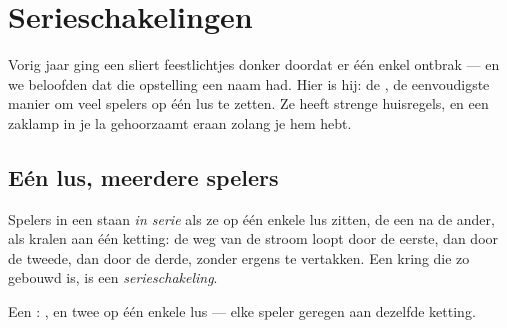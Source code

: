\chapter{Serieschakelingen}\label{ch:g4:series-circuits}

Vorig jaar ging een sliert feestlichtjes donker doordat er één enkel
 ontbrak --- en we beloofden dat die opstelling een naam had.
Hier is hij: de , de eenvoudigste manier om veel spelers
op één lus te zetten. Ze heeft strenge huisregels, en een zaklamp in
je la gehoorzaamt eraan zolang je hem hebt.

\section{Eén lus, meerdere spelers}

\begin{definition}[In serie]\label{def:g4:series-circuits:series}
Spelers in een  staan \emph{in serie}
als ze op één enkele lus zitten, de een na de ander, als kralen aan
één ketting: de weg van de stroom loopt door de eerste, dan door de
tweede, dan door de derde, zonder ergens te vertakken. Een kring die zo
gebouwd is, is een \emph{serieschakeling}.
\end{definition}

\begin{omfigure}

{\small Een : ,  en twee
 op één enkele lus --- elke speler geregen aan dezelfde ketting.}
\end{omfigure}

